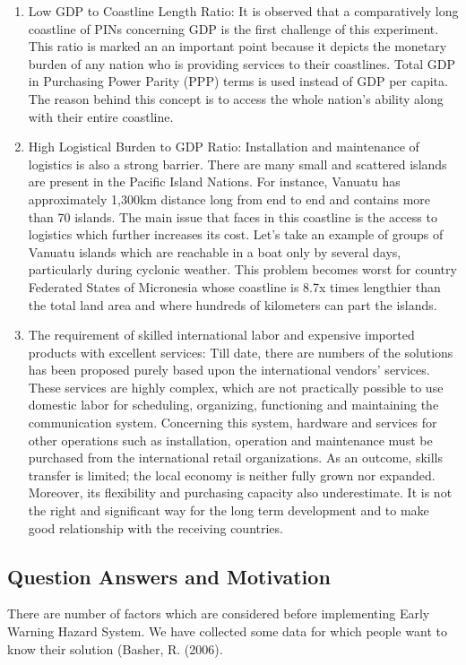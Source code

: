  \begin{enumerate}
\item Low GDP to Coastline Length Ratio: It is observed that a comparatively long coastline of PINs concerning GDP is the first challenge of this experiment. This ratio is marked an an important point because it depicts the monetary burden of any nation who is providing services to their coastlines.  Total GDP in Purchasing Power Parity (PPP) terms is used instead of GDP per capita. The reason behind this concept is to access the whole nation’s ability along with their entire coastline. 
\item High Logistical Burden to GDP Ratio: Installation and maintenance of logistics is also a strong barrier. There are many small and scattered islands are present in the Pacific Island Nations. For instance, Vanuatu has approximately 1,300km distance long from end to end and contains more than 70 islands. The main issue that faces in this coastline is the access to logistics which further increases its cost. Let’s take an example of groups of Vanuatu islands which are reachable in a boat only by several days, particularly during cyclonic weather. This problem becomes worst for country Federated States of Micronesia whose coastline is 8.7x times lengthier than the total land area and where hundreds of kilometers can part the islands. 
\item The requirement of skilled international labor and expensive imported products with excellent services:  Till date, there are numbers of the solutions has been proposed purely based upon the international vendors' services. These services are highly complex, which are not practically possible to use domestic labor for scheduling, organizing, functioning and maintaining the communication system.  Concerning this system, hardware and services for other operations such as installation, operation and maintenance must be purchased from the international retail organizations. As an outcome, skills transfer is limited; the local economy is neither fully grown nor expanded. Moreover, its flexibility and purchasing capacity also underestimate. It is not the right and significant way for the long term development and to make good relationship with the receiving countries.
\end{enumerate}

\subsection{Question Answers and Motivation}\label{Questions_Answers_and_Motivation}
There are number of factors  which are considered before implementing Early Warning Hazard System. We 
have collected some data for which people want to know their solution (Basher, R. (2006).

